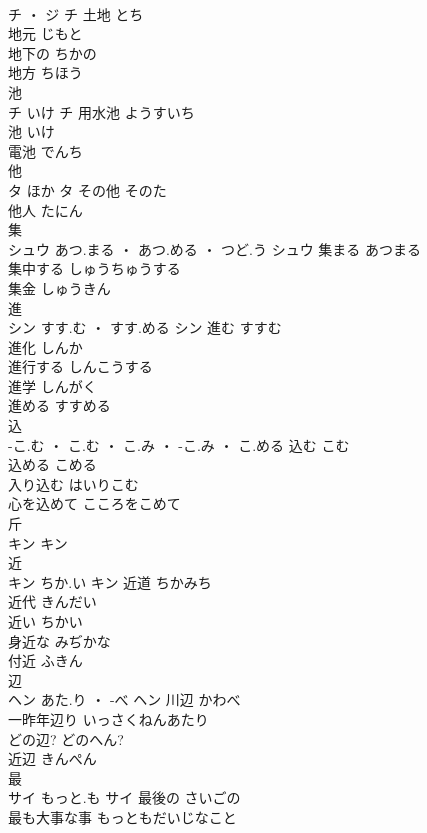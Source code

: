 \documentclass[8pt]{extreport}
\begin{document}
\begin{CJK}{UTF8}{min}
\\	チ ・ ジ		チ	土地	とち	
\\	地元	じもと	
\\	地下の	ちかの	
\\	地方	ちほう	
\\	池	
\\	チ	いけ	チ	用水池	ようすいち	
\\	池	いけ	
\\	電池	でんち	
\\	他	
\\	タ	ほか	タ	その他	そのた	
\\	他人	たにん	
\\	集	
\\	シュウ	あつ.まる ・ あつ.める ・ つど.う	シュウ	集まる	あつまる	
\\	集中する	しゅうちゅうする	
\\	集金	しゅうきん	
\\	進	
\\	シン	すす.む ・ すす.める	シン	進む	すすむ	
\\	進化	しんか	
\\	進行する	しんこうする	
\\	進学	しんがく	
\\	進める	すすめる	
\\	込	
\\	-こ.む ・ こ.む ・ こ.み ・ -こ.み ・ こ.める		込む	こむ	
\\	込める	こめる	
\\	入り込む	はいりこむ	
\\	心を込めて	こころをこめて	
\\	斤	
\\	キン		キン																																			
\\	近	
\\	キン	ちか.い	キン	近道	ちかみち	
\\	近代	きんだい	
\\	近い	ちかい	
\\	身近な	みぢかな	
\\	付近	ふきん	
\\	辺	
\\	ヘン	あた.り ・ -べ	ヘン	川辺	かわべ	
\\	一昨年辺り	いっさくねんあたり	
\\	どの辺?	どのへん?	
\\	近辺	きんぺん	
\\	最	
\\	サイ	もっと.も	サイ	最後の	さいごの	
\\	最も大事な事	もっともだいじなこと	

\end{CJK}
\end{document}
